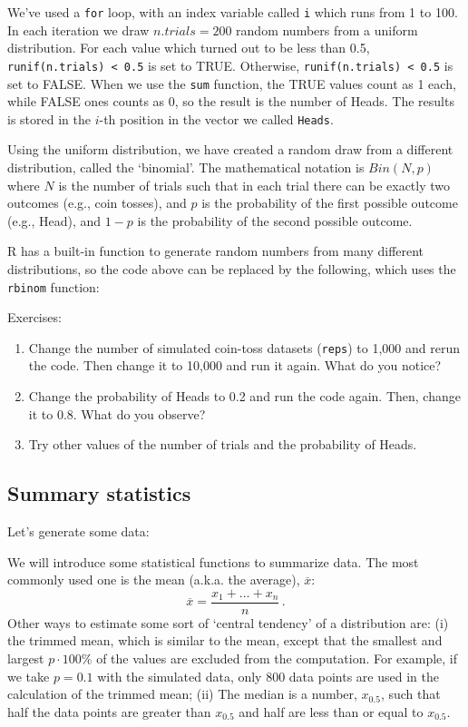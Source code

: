 We've used a \texttt{for} loop, with an index variable called \texttt{i} which runs from 1 to 100. In each iteration we draw $n.trials=200$ random numbers from a uniform distribution. For each value which turned out to be less than 0.5, \texttt{runif(n.trials) < 0.5} is set to TRUE. Otherwise, \texttt{runif(n.trials) < 0.5} is set to FALSE. When we use the \texttt{sum} function, the TRUE values count as 1 each, while FALSE ones counts as 0, so the result is the number of Heads. The results is stored in the $i$-th position in the vector we called \texttt{Heads}.

Using the uniform distribution, we have created a random draw from a different distribution, called the `binomial'. The mathematical notation is $Bin(N, p)$ where $N$ is the number of trials such that in each trial there can be exactly two outcomes (e.g., coin tosses), and $p$ is the probability of the first possible outcome (e.g., Head), and $1-p$ is the probability of the second possible outcome.

R has a built-in function to generate random numbers from many different distributions, so the code above can be replaced by the following, which uses the \texttt{rbinom} function:



Exercises:
\begin{enumerate}
\item Change the number of simulated coin-toss datasets (\texttt{reps}) to 1,000 and rerun the code. Then change it to 10,000 and run it again. What do you notice?
\item Change the probability of Heads to 0.2 and run the code again. Then, change it to 0.8. What do you observe?
\item Try other values of the number of trials and the probability of Heads.
\end{enumerate}

\subsection{Summary statistics}
Let's generate some data:


We will introduce some statistical functions to summarize data. The most commonly used one is the mean (a.k.a. the average), $\overline{x}$:\\
$$\overline{x}=\frac{x_1+\ldots+x_n}{n}\,.$$
Other ways to estimate some sort of `central tendency' of a distribution are:
 (i) the trimmed mean, which is similar to the mean, except that the smallest and largest $p\cdot 100\%$  of the values are excluded from the computation. For example, if we take $p=0.1$ with the simulated data, only 800 data points are used in the calculation of the trimmed mean; (ii) The median is a number, $x_{0.5}$, such that half the data points are greater than $x_{0.5}$ and half are less than or equal to $x_{0.5}$. 

